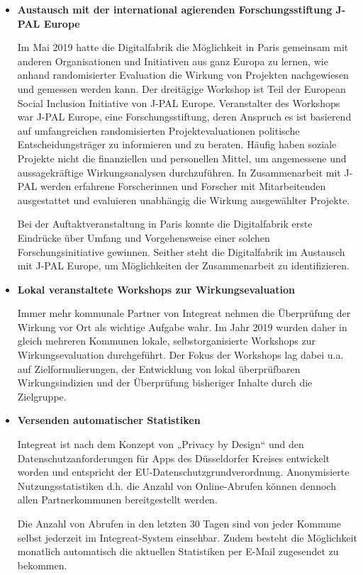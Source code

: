 \documentclass[12pt, a4paper]{article} %
\begin{document}
\begin{itemize}
\item

  \textbf{Austausch mit der international agierenden Forschungsstiftung
  J-PAL Europe}

Im Mai 2019 hatte die Digitalfabrik die Möglichkeit in Paris gemeinsam
mit anderen Organisationen und Initiativen aus ganz Europa zu lernen,
wie anhand randomisierter Evaluation die Wirkung von Projekten
nachgewiesen und gemessen werden kann. Der dreitägige Workshop ist Teil
der European Social Inclusion Initiative von J-PAL Europe. Veranstalter
des Workshops war J-PAL Europe, eine Forschungsstiftung, deren Anspruch
es ist basierend auf umfangreichen randomisierten Projektevaluationen
politische Entscheidungsträger zu informieren und zu beraten. Häufig
haben soziale Projekte nicht die finanziellen und personellen Mittel, um
angemessene und aussagekräftige Wirkungsanalysen durchzuführen. In
Zusammenarbeit mit J-PAL werden erfahrene Forscherinnen und Forscher mit
Mitarbeitenden ausgestattet und evaluieren unabhängig die Wirkung
ausgewählter Projekte.

Bei der Auftaktveranstaltung in Paris konnte die Digitalfabrik erste
Eindrücke über Umfang und Vorgehensweise einer solchen
Forschungsinitiative gewinnen. Seither steht die Digitalfabrik im
Austausch mit J-PAL Europe, um Möglichkeiten der Zusammenarbeit zu
identifizieren.

\item  \textbf{Lokal veranstaltete Workshops zur Wirkungsevaluation}

Immer mehr kommunale Partner von Integreat nehmen die Überprüfung der
Wirkung vor Ort als wichtige Aufgabe wahr. Im Jahr 2019 wurden daher in
gleich mehreren Kommunen lokale, selbstorganisierte Workshops zur
Wirkungsevaluation durchgeführt. Der Fokus der Workshops lag dabei u.a.
auf Zielformulierungen, der Entwicklung von lokal überprüfbaren
Wirkungsindizien und der Überprüfung bisheriger Inhalte durch die
Zielgruppe.

\item  \textbf{Versenden automatischer Statistiken}


Integreat ist nach dem Konzept von „Privacy by Design“ und den
Datenschutzanforderungen für Apps des Düsseldorfer Kreises entwickelt
worden und entspricht der EU-Datenschutzgrundverordnung. Anonymisierte
Nutzungsstatistiken d.h. die Anzahl von Online-Abrufen können dennoch
allen Partnerkommunen bereitgestellt werden.

Die Anzahl von Abrufen in den letzten 30 Tagen sind von jeder Kommune
selbst jederzeit im Integreat-System einsehbar. Zudem besteht die
Möglichkeit monatlich automatisch die aktuellen Statistiken per E-Mail
zugesendet zu bekommen.


\end{itemize}
\end{document}
